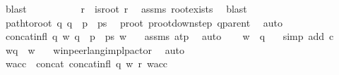\begin{isabellebody}
\ blast\isanewline
\ \ \ \ \ \ \isanewline
\ \ \isamarkupfalse%
\ r\ \ {\isachardoublequoteopen}is{\isacharunderscore}{\kern0pt}root\ r{\isachardoublequoteclose}\ \isamarkupfalse%
\ assms{\isacharparenleft}{\kern0pt}{}{\isacharparenright}{\kern0pt}\ root{\isacharunderscore}{\kern0pt}exists\ \isamarkupfalse%
\ blast\isanewline
\ \ \isamarkupfalse%
\ {\isachardoublequoteopen}path{\isacharunderscore}{\kern0pt}to{\isacharunderscore}{\kern0pt}root\ q\ {\isacharparenleft}{\kern0pt}q\ {\isacharhash}{\kern0pt}\ p\ {\isacharhash}{\kern0pt}\ ps{\isacharparenright}{\kern0pt}{\isachardoublequoteclose}\ \isamarkupfalse%
\ p{}root\ p{}root{\isacharunderscore}{\kern0pt}down{\isacharunderscore}{\kern0pt}step\ q{\isacharunderscore}{\kern0pt}parent\ \isamarkupfalse%
\ auto\isanewline
\ \ \isamarkupfalse%
\ \isamarkupfalse%
\ {\isachardoublequoteopen}concat{\isacharunderscore}{\kern0pt}infl\ q\ w\ {\isacharparenleft}{\kern0pt}q\ {\isacharhash}{\kern0pt}\ p\ {\isacharhash}{\kern0pt}\ ps{\isacharparenright}{\kern0pt}\ w{\isachardoublequoteclose}\ \ \isamarkupfalse%
\ assms{\isacharparenleft}{\kern0pt}{}{\isacharcomma}{\kern0pt}{}{\isacharparenright}{\kern0pt}\ at{\isacharunderscore}{\kern0pt}p\ \isamarkupfalse%
\ auto\isanewline
\ \ \isamarkupfalse%
\ {\isachardoublequoteopen}w\ {\isasymin}\ {\isasymL}{\isacharparenleft}{\kern0pt}q{\isacharparenright}{\kern0pt}{\isachardoublequoteclose}\ \ \isamarkupfalse%
\ {\isacharparenleft}{\kern0pt}simp\ add{\isacharcolon}{\kern0pt}\ c{}{\isacharparenright}{\kern0pt}\isanewline
\ \ \isamarkupfalse%
\ \isamarkupfalse%
\ {\isachardoublequoteopen}w{\isasymdown}\isactrlsub q\ {\isacharequal}{\kern0pt}\ w{\isachardoublequoteclose}\ \ \isamarkupfalse%
\ w{\isacharunderscore}{\kern0pt}in{\isacharunderscore}{\kern0pt}peer{\isacharunderscore}{\kern0pt}lang{\isacharunderscore}{\kern0pt}impl{\isacharunderscore}{\kern0pt}p{\isacharunderscore}{\kern0pt}actor\ \isamarkupfalse%
\ auto\isanewline
\ \ \ \ \ \ \isanewline
\ \ \ \ \ \ \isanewline
\ \ \ \ \ \ \isanewline
\ \ \isamarkupfalse%
\ w{\isacharunderscore}{\kern0pt}acc\ \ concat{\isacharcolon}{\kern0pt}\ {\isachardoublequoteopen}concat{\isacharunderscore}{\kern0pt}infl\ q\ w\ {\isacharbrackleft}{\kern0pt}r{\isacharbrackright}{\kern0pt}\ w{\isacharunderscore}{\kern0pt}acc{\isachardoublequoteclose}\ \isamarkupfalse%

\end{isabellebody}
